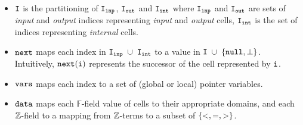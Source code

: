 \begin{itemize}
 \item $\tt I$ is the partitioning of $\tt I_{inp}$, $\tt I_{out}$ and $\tt I_{int}$ where $\tt I_{inp}$ and $\tt I_{out}$ are sets of {\em input} and {\em output} indices representing {\em input} and {\em output} cells, $\tt I_{int}$ is the set of indices representing {\em internal} cells.

 \item $\tt next$ maps each index in $\tt I_{inp} \; \cup \; \tt I_{int}$ to a value in ${\tt I} \; \cup \; \{\tt null, \bot\}$. Intuitively, $\tt next(i)$ represents the successor of the cell represented by $\tt i$.


\item
  ${\tt vars}$ maps each index to a set of (global or local) pointer variables.
\item
  ${\tt data}$ maps each $\mathbb{F}$-field value of cells to their appropriate domains, and each ${\mathbb Z}$-field to a mapping from ${\mathbb Z}$-terms to a subset of $\left\{<, =, >\right\}$.

 

\end{itemize}
